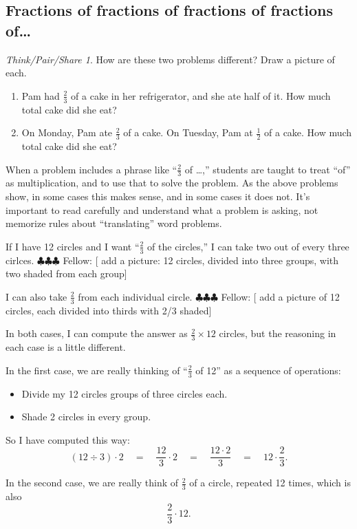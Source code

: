 \documentclass[10pt, reqno]{amsart}
\theoremstyle{remark}
\newtheorem*{thinkpair*}{Think/Pair/Share}
\theoremstyle{definition}
\numberwithin{equation}{section}  %
\newcommand{\fellow}[1]{{\color{magenta} \sf $\clubsuit\clubsuit\clubsuit$ Fellow: [#1]}}
\begin{document}
\subsection{Fractions of fractions of fractions of fractions of\dots}
\begin{thinkpair*}
How are these two problems different?  Draw a picture of each.
\begin{enumerate}
\item
Pam had $\frac 2 3$ of a cake in her refrigerator, and she ate half of it.  How much total cake did she eat?
\item
On Monday, Pam ate $\frac 2 3$ of a cake.  On Tuesday, Pam at $\frac 1 2$ of a cake.  How much total cake did she eat?
\end{enumerate}
\end{thinkpair*}




When a problem includes a phrase like ``$\frac 2 3 $ of \dots,'' students are taught to treat ``of'' as multiplication, and to use that to solve the problem.  As the above problems show, in some cases this makes sense, and in some cases it does not.  It's important  to read carefully and understand what a problem is asking, not memorize rules about ``translating'' word problems.

If I have 12 circles and I want ``$\frac 2 3$ of the circles,'' I can take two out of every three cirlces.
\fellow{ add a picture: 12 circles, divided into three groups, with two shaded from each group}

  I can also take $\frac 2 3$ from each individual circle.  
  \fellow{ add a picture of 12 circles, each divided into thirds with 2/3 shaded}
  
  In both cases, I can compute the answer as 
 $\frac 2 3 \times 12$ circles, but the reasoning in each case is a little different.  
 
 In the first case, we are really thinking of ``$\frac 2 3$ of 12'' as a sequence of operations: 
 \begin{itemize}
 \item
 Divide my 12 circles groups of three circles each.  
 \item
 Shade 2 circles in every group.  
 \end{itemize}
 So I have computed this way:
 \[
 (12 \div 3) \cdot 2 
 \quad
 =
 \quad
 \frac{12}3 \cdot 2 
 \quad
 =
 \quad
 \frac{12\cdot 2}{3}
 \quad
 =
 \quad
 12 \cdot \frac 2 3.
 \]
 
 In the second case, we are really think of $\frac 2 3$ of a circle, repeated 12 times, which is also
 \[
 \frac 2 3 \cdot 12.
 \]
\end{document}
